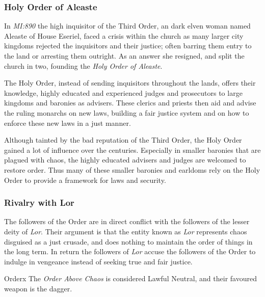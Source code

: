 \subsubsection{Holy Order of Aleaste}
\label{sec:Holy Order of Aleaste}

In \emph{MI:890} the high inquisitor of the Third Order, an dark elven woman
named Aleaste of House Eseriel, faced a crisis within the church as many
larger city kingdoms rejected the inquisitors and their justice; often barring
them entry to the land or arresting them outright. As an answer she resigned,
and split the church in two, founding the \emph{Holy Order of Aleaste}.

The Holy Order, instead of sending inquisitors throughout the lands, offers
their knowledge, highly educated and experienced judges and prosecutors to
large kingdoms and baronies as advisers. These clerics and priests then aid
and advise the ruling monarchs on new laws, building a fair justice system and
on how to enforce these new laws in a just manner.

Although tainted by the bad reputation of the Third Order, the Holy Order
gained a lot of influence over the centuries. Especially in smaller baronies
that are plagued with chaos, the highly educated advisers and judges are
welcomed to restore order. Thus many of these smaller baronies and earldoms
rely on the Holy Order to provide a framework for laws and security.

\subsubsection{Rivalry with Lor}

The followers of the Order are in direct conflict with the followers of the
lesser deity of \emph{Lor}. Their argument is that the entity known as
\emph{Lor} represents chaos disguised as a just crusade, and does nothing to
maintain the order of things in the long term. In return the followers of
\emph{Lor} accuse the followers of the Order to indulge in vengeance instead
of seeking true and fair justice.

\begin{35e}{Order}x
  The \emph{Order Above Chaos} is considered Lawful Neutral, and their favoured
  weapon is the dagger.
\end{35e}
